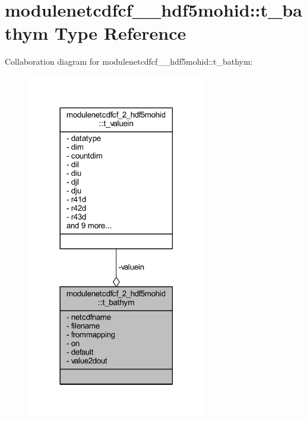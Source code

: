 \hypertarget{structmodulenetcdfcf__2__hdf5mohid_1_1t__bathym}{}\section{modulenetcdfcf\+\_\+\_\+hdf5mohid\+:\+:t\+\_\+bathym Type Reference}
\label{structmodulenetcdfcf__2__hdf5mohid_1_1t__bathym}


Collaboration diagram for modulenetcdfcf\+\_\+\_\+hdf5mohid\+:\+:t\+\_\+bathym\+:\nopagebreak
\begin{figure}[H]
\begin{center}
\leavevmode
\includegraphics[width=222pt]{structmodulenetcdfcf__2__hdf5mohid_1_1t__bathym__coll__graph}
\end{center}
\end{figure}
